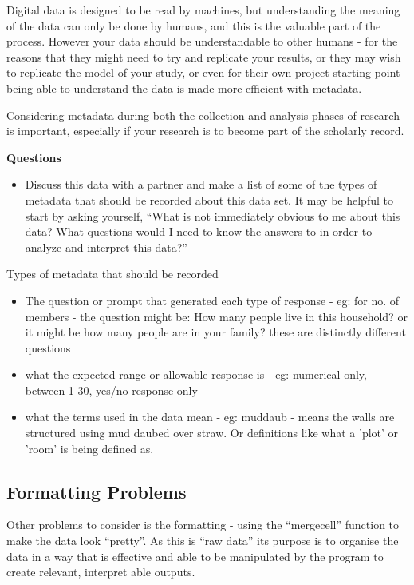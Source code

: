 \documentclass{article}
\begin{document}
Digital data is designed to be read by machines, but understanding the meaning of the data can only be done by humans, and this is the valuable part of the process. However your data should be understandable to other humans - for the reasons that they might need to try and replicate your results, or they may wish to replicate the model of your study, or even for their own project starting point - being able to understand the data is made more efficient with metadata. 

Considering metadata during both the collection and analysis phases of research is important, especially if your research is to become part of the scholarly record. 

\noindent \textbf{Questions}
\begin{itemize}
    \item Discuss this data with a partner and make a list of some of the types of metadata that should be recorded about this data set. It may be helpful to start by asking yourself, ``What is not immediately obvious to me about this data? What questions would I need to know the answers to in order to analyze and interpret this data?''
\end{itemize}

Types of metadata that should be recorded
\begin{itemize}
    \item The question or prompt that generated each type of response - eg: for no. of members - the question might be: How many people live in this household? or it might be how many people are in your family? these are distinctly different questions
    \item what the expected range or allowable response is - eg: numerical only, between 1-30, yes/no response only
    \item what the terms used in the data mean - eg: muddaub - means the walls are structured using mud daubed over straw. Or definitions like what a 'plot' or 'room' is being defined as. 
\end{itemize}

\subsection{Formatting Problems}

Other problems to consider is the formatting - using the ``mergecell'' function to make the data look ``pretty''.
As this is ``raw data'' its purpose is to organise the data in a way that is effective and able to be manipulated by the program to create relevant, interpret able outputs. 
\end{document}
